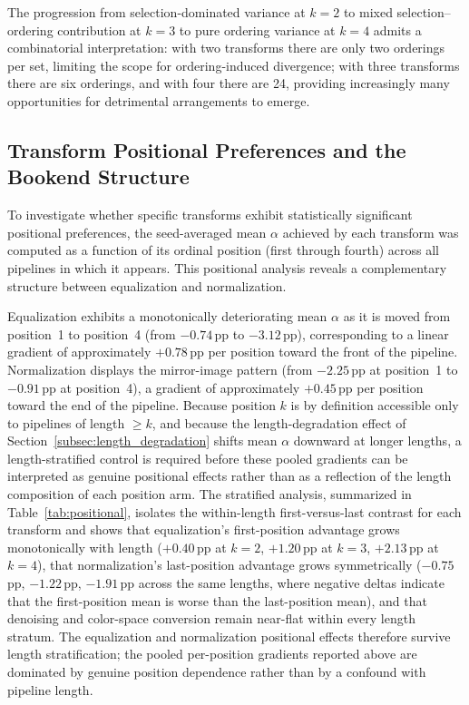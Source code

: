 \documentclass[preprint,5p,times,twocolumn]{elsarticle}
\begin{document}
The progression from selection-dominated variance at $k=2$ to mixed selection--ordering contribution at $k=3$ to pure ordering variance at $k=4$ admits a combinatorial interpretation: with two transforms there are only two orderings per set, limiting the scope for ordering-induced divergence; with three transforms there are six orderings, and with four there are 24, providing increasingly many opportunities for detrimental arrangements to emerge.

\subsection{Transform Positional Preferences and the Bookend Structure}
\label{subsec:positional}

To investigate whether specific transforms exhibit statistically significant positional preferences, the seed-averaged mean $\alpha$ achieved by each transform was computed as a function of its ordinal position (first through fourth) across all pipelines in which it appears. This positional analysis reveals a complementary structure between equalization and normalization.

Equalization exhibits a monotonically deteriorating mean $\alpha$ as it is moved from position~1 to position~4 (from $-0.74$\,pp to $-3.12$\,pp), corresponding to a linear gradient of approximately $+0.78$\,pp per position toward the front of the pipeline. Normalization displays the mirror-image pattern (from $-2.25$\,pp at position~1 to $-0.91$\,pp at position~4), a gradient of approximately $+0.45$\,pp per position toward the end of the pipeline. Because position $k$ is by definition accessible only to pipelines of length $\geq k$, and because the length-degradation effect of Section~\ref{subsec:length_degradation} shifts mean $\alpha$ downward at longer lengths, a length-stratified control is required before these pooled gradients can be interpreted as genuine positional effects rather than as a reflection of the length composition of each position arm. The stratified analysis, summarized in Table~\ref{tab:positional}, isolates the within-length first-versus-last contrast for each transform and shows that equalization's first-position advantage grows monotonically with length ($+0.40$\,pp at $k=2$, $+1.20$\,pp at $k=3$, $+2.13$\,pp at $k=4$), that normalization's last-position advantage grows symmetrically ($-0.75$\,pp, $-1.22$\,pp, $-1.91$\,pp across the same lengths, where negative deltas indicate that the first-position mean is worse than the last-position mean), and that denoising and color-space conversion remain near-flat within every length stratum. The equalization and normalization positional effects therefore survive length stratification; the pooled per-position gradients reported above are dominated by genuine position dependence rather than by a confound with pipeline length.
\end{document}
